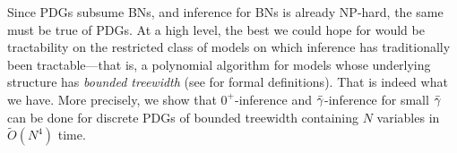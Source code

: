 Since PDGs subsume BNs, and inference for BNs is already NP-hard, the same must be true of PDGs.
At a high level, the best we could hope for would be tractability on the restricted
class of models on which inference has traditionally been tractable---that is, a polynomial algorithm for models whose
underlying structure has \emph{bounded treewidth} (see
 for formal definitions).
That is indeed what we have.  
More precisely, we show that
$0^+$-inference
and ${\bar\gamma}$-inference for small ${\bar\gamma}$ 
can be done 
for discrete PDGs of bounded treewidth containing $N$ variables in
$\tilde O(N^4)$ 
time.
